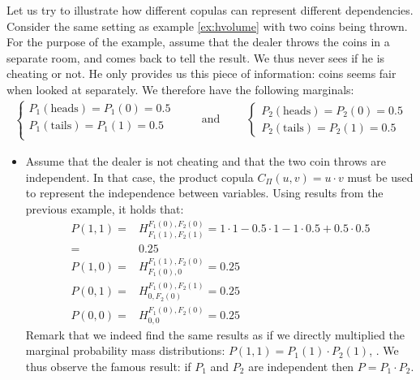\begin{example}\label{ex:copulas}
    Let us try to illustrate how different copulas can represent different dependencies. 
    Consider the same setting as example \ref{ex:hvolume} with two coins being thrown. For the purpose of the example, assume that the dealer throws the coins in a separate room, and comes back to tell the result. We thus never sees if he is cheating or not. He only provides us this piece of information: coins seems fair when looked at separately. We therefore have the following marginals:
    \begin{eqnarray*}
    \begin{cases}
        P_1(\text{heads}) = P_1(0) = 0.5\\
        P_1(\text{tails}) = P_1(1) = 0.5\\
    \end{cases}
    \qquad\text{ and }\qquad
    \begin{cases}
        P_2(\text{heads}) = P_2(0) = 0.5\\
        P_2(\text{tails}) = P_2(1) = 0.5
    \end{cases}
    \end{eqnarray*}
    
    \begin{itemize}
        \item Assume that the dealer is not cheating and that the two coin throws are independent. In that case, the product copula $C_\Pi(u,v)=u\cdot v$  must be used to represent the independence between variables.
        Using results from the previous example, it holds that:
        \begin{align*}
            P(1,1) =& H_{F_1(1), F_2(1)}^{F_1(0), F_2(0)} = 1\cdot1 - 0.5\cdot1 - 1\cdot0.5 + 0.5\cdot0.5\\
            =& 0.25\\
            P(1,0) =& H_{F_1(0), 0}^{F_1(1), F_2(0)} = 0.25 \\
            P(0,1) =& H_{0, F_2(0)}^{F_1(0), F_2(1)} = 0.25 \\
            P(0,0) =& H_{0, 0}^{F_1(0), F_2(0)} = 0.25
        \end{align*}
        Remark that we indeed find the same results as if we directly multiplied the marginal probability mass distributions: $P(1,1) = P_1(1)\cdot P_2(1)$, \etc. We thus observe the famous result: if $P_1$ and $P_2$ are independent then $P=P_1\cdot P_2$.
        

\end{itemize}
\end{example}
